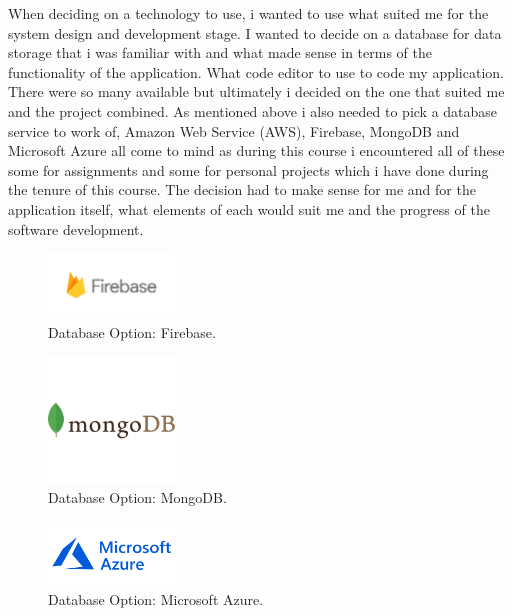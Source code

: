 When deciding on a technology to use, i wanted to use what suited me for the system design and development stage. I wanted to decide on  a database for data storage that i was familiar with and what made sense in terms of the functionality of the application. What code editor to use to code my application. There were so many available but ultimately i decided on the one that suited me and the project combined. As mentioned above i also needed to pick a database service to work of, Amazon Web Service (AWS), Firebase, MongoDB and Microsoft Azure all come to mind as during this course i encountered all of these some for assignments and some for personal projects which i have done during the tenure of this course. The decision had to make sense for me and for the application itself, what elements of each would suit me and the progress of the software development.
\newline

\begin{figure}[h!]
	\caption{Database Option: Firebase.}
	\label{image:firebase}
	\centering
	\includegraphics[width=0.3\textwidth]{images/firebase.png}
\end{figure}

\begin{figure}[h!]
	\caption{Database Option: MongoDB.}
	\label{image:mongodb}
	\centering
	\includegraphics[width=0.3\textwidth]{images/mongodb.png}
\end{figure}

\newpage

\begin{figure}[h!]
	\caption{Database Option: Microsoft Azure.}
	\label{image:azure}
	\centering
	\includegraphics[width=0.3\textwidth]{images/azure.png}
\end{figure}

